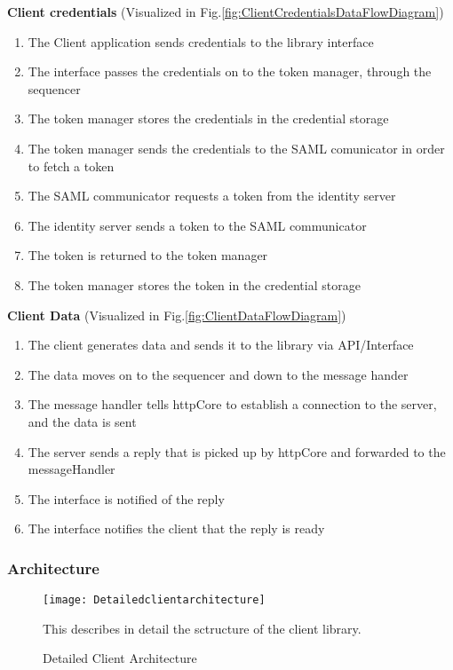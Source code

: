 	\textbf{Client credentials} (Visualized in Fig.\ref{fig:ClientCredentialsDataFlowDiagram})
		\begin{enumerate}
			\item The Client application sends credentials to the library interface
			\item The interface passes the credentials on to the token manager, through the sequencer
			\item The token manager stores the credentials in the credential storage
			\item The token manager sends the credentials to the SAML comunicator in order to fetch a token
			\item The SAML communicator requests a token from the identity server
			\item The identity server sends a token to the SAML communicator
			\item The token is returned to the token manager
			\item The token manager stores the token in the credential storage
		\end{enumerate}
		
		\textbf{Client Data} (Visualized in Fig.\ref{fig:ClientDataFlowDiagram})
		\begin{enumerate}
			\item The client generates data and sends it to the library via API/Interface
			\item The data moves on to the sequencer and down to the message hander
			\item The message handler tells httpCore to establish a connection to the server, and the data is sent
			\item The server sends a reply that is picked up by httpCore and forwarded to the messageHandler
			\item The interface is notified of the reply
			\item The interface notifies the client that the reply is ready
		\end{enumerate}
		
	\subsubsection{Architecture}\label{client architecture}
		\begin{figure}[h]
			\centering	
			\texttt{[image: Detailedclientarchitecture]}
			\caption{Detailed Client Architecture}
			This describes in detail the sctructure of the client library. 
			\label{fig:DetailedClientArchitecture}
		\end{figure}


